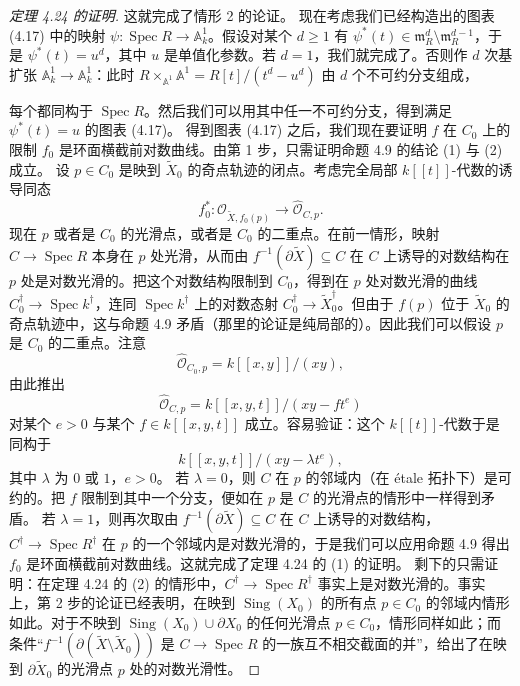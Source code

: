\begin{proof}[定理 4.24 的证明]
这就完成了情形 2 的论证。
现在考虑我们已经构造出的图表 (4.17) 中的映射 $\psi:\operatorname{Spec}R\to\mathbb{A}^1_k$。假设对某个 $d\ge1$ 有 $\psi^*(t)\in\mathfrak m_R^d\setminus\mathfrak m_R^{d-1}$，于是 $\psi^*(t)=u^d$，其中 $u$ 是单值化参数。若 $d=1$，我们就完成了。否则作 $d$ 次基扩张 $\mathbb{A}^1_k\to\mathbb{A}^1_k$：此时 $R\times_{\mathbb{A}^1}\mathbb{A}^1=R[t]/(t^d-u^d)$ 由 $d$ 个不可约分支组成，

每个都同构于 $\operatorname{Spec}R$。然后我们可以用其中任一不可约分支，得到满足 $\psi^*(t)=u$ 的图表 (4.17)。
 得到图表 (4.17) 之后，我们现在要证明 $f$ 在 $C_0$ 上的限制 $f_0$ 是环面横截前对数曲线。由第 1 步，只需证明命题 4.9 的结论 (1) 与 (2) 成立。
设 $p\in C_0$ 是映到 $\widetilde X_0$ 的奇点轨迹的闭点。考虑完全局部 $k[[t]]$-代数的诱导同态
\[
f^*_0:\widehat{\mathcal O}_{\widetilde X,f_0(p)}\to\widehat{\mathcal O}_{C,p}.
\]
现在 $p$ 或者是 $C_0$ 的光滑点，或者是 $C_0$ 的二重点。在前一情形，映射 $C\to\operatorname{Spec}R$ 本身在 $p$ 处光滑，从而由 $f^{-1}(\partial\widetilde X)\subseteq C$ 在 $C$ 上诱导的对数结构在 $p$ 处是对数光滑的。把这个对数结构限制到 $C_0$，得到在 $p$ 处对数光滑的曲线 $C^\dagger_0\to\operatorname{Spec}k^\dagger$，连同 $\operatorname{Spec}k^\dagger$ 上的对数态射 $C^\dagger_0\to\widetilde X^\dagger_0$。但由于 $f(p)$ 位于 $\widetilde X_0$ 的奇点轨迹中，这与命题 4.9 矛盾（那里的论证是纯局部的）。因此我们可以假设 $p$ 是 $C_0$ 的二重点。注意
\[
\widehat{\mathcal O}_{C_0,p}=k[[x,y]]/(xy),
\]
由此推出
\[
\widehat{\mathcal O}_{C,p}=k[[x,y,t]]/(xy-ft^e)
\]
对某个 $e>0$ 与某个 $f\in k[[x,y,t]]$ 成立。容易验证：这个 $k[[t]]$-代数于是同构于
\[
k[[x,y,t]]/(xy-\lambda t^e),
\]
其中 $\lambda$ 为 $0$ 或 $1$，$e>0$。
若 $\lambda=0$，则 $C$ 在 $p$ 的邻域内（在 étale 拓扑下）是可约的。把 $f$ 限制到其中一个分支，便如在 $p$ 是 $C$ 的光滑点的情形中一样得到矛盾。
若 $\lambda=1$，则再次取由 $f^{-1}(\partial\widetilde X)\subseteq C$ 在 $C$ 上诱导的对数结构，$C^\dagger\to\operatorname{Spec}R^\dagger$ 在 $p$ 的一个邻域内是对数光滑的，于是我们可以应用命题 4.9 得出 $f_0$ 是环面横截前对数曲线。这就完成了定理 4.24 的 (1) 的证明。
 剩下的只需证明：在定理 4.24 的 (2) 的情形中，$C^\dagger\to\operatorname{Spec}R^\dagger$ 事实上是对数光滑的。事实上，第 2 步的论证已经表明，在映到 $\operatorname{Sing}(X_0)$ 的所有点 $p\in C_0$ 的邻域内情形如此。对于不映到 $\operatorname{Sing}(X_0)\cup\partial X_0$ 的任何光滑点 $p\in C_0$，情形同样如此；而条件“$f^{-1}(\partial(\widetilde X\setminus\widetilde X_0))$ 是 $C\to\operatorname{Spec}R$ 的一族互不相交截面的并”，给出了在映到 $\partial\widetilde X_0$ 的光滑点 $p$ 处的对数光滑性。

\end{proof}
